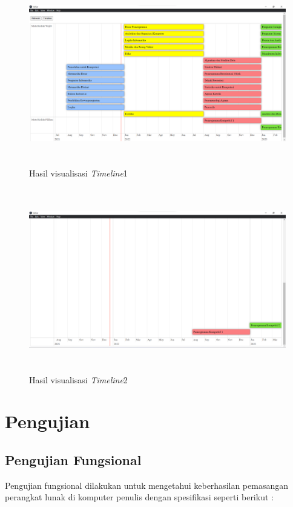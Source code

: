 \begin{itemize}
    \begin{figure}[H]
        \centering
        \includegraphics[width=12cm, height=8cm]{Gambar/Timeline1.png}
        \caption{Hasil visualisasi \textit{Timeline}1}
        \label{fig:gambarTimeline1}
    \end{figure}
    
    \begin{figure}[H]
        \centering
        \includegraphics[width=12cm, height=8cm]{Gambar/Timeline2.png}
        \caption{Hasil visualisasi \textit{Timeline}2}
        \label{fig:gambarTimeline2}
    \end{figure}
    
\end{itemize}

\section{Pengujian}

\subsection{Pengujian Fungsional}
Pengujian fungsional dilakukan untuk mengetahui keberhasilan pemasangan perangkat lunak di komputer penulis dengan spesifikasi seperti berikut :
\vspace{3mm}

